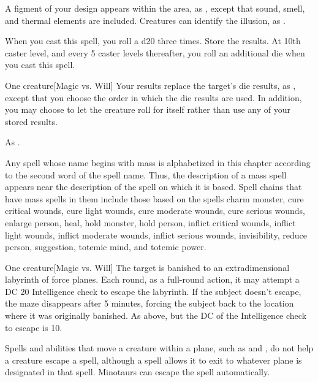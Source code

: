 \spelldur{\durshort}
\spellline
\spelleffect A figment of your design appears within the area, as , except that sound, smell, and thermal elements are included.
\spellnotes Creatures can identify the illusion, as .

\spellrng{\rngmed}
\spellspecial When you cast this spell, you roll a d20 three times. Store the results. At 10th caster level, and every 5 caster levels thereafter, you roll an additional die when you cast this spell.
\begin{spelltarget}{One creature}[Magic vs. Will]
    \spellsuccess Your results replace the target's die results, as , except that you choose the order in which the die results are used. In addition, you may choose to let the creature roll for itself rather than use any of your stored results.
\end{spelltarget}
\spellnotes As .

\par Any spell whose name begins with mass is alphabetized in this chapter according to the second word of the spell name. Thus, the description of a mass spell appears near the description of the spell on which it is based. Spell chains that have mass spells in them include those based on the spells charm monster, cure critical wounds, cure light wounds, cure moderate wounds, cure serious wounds, enlarge person, heal, hold monster, hold person, inflict critical wounds, inflict light wounds, inflict moderate wounds, inflict serious wounds, invisibility, reduce person, suggestion, totemic mind, and totemic power.

\spellrng{\rngmed}
\begin{spelltarget}{One creature}[Magic vs. Will]
    \spellsuccess The target is banished to an extradimensional labyrinth of force planes. Each round, as a full-round action, it may attempt a DC 20 Intelligence check to escape the labyrinth. If the subject doesn't escape, the maze disappears after 5 minutes, forcing the subject back to the location where it was originally banished.
    \spellfailure As above, but the DC of the Intelligence check to escape is 10.
\end{spelltarget}
\spellnotes Spells and abilities that move a creature within a plane, such as  and , do not help a creature escape a  spell, although a  spell allows it to exit to whatever plane is designated in that spell. Minotaurs can escape the spell automatically.

